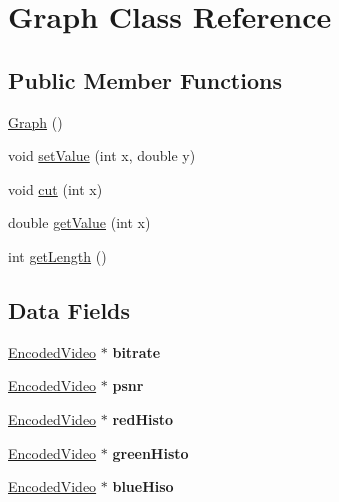 \hypertarget{classGraph}{}\section{Graph Class Reference}
\label{classGraph}
\subsection*{Public Member Functions}
\begin{DoxyCompactItemize}
\item 
\hyperlink{classGraph_afc5ef9d72cc2c509814200791eaef62c}{Graph} ()
\item 
void \hyperlink{classGraph_ab2daf3a9b66c016d330dedbd83d3fa82}{set\+Value} (int x, double y)
\item 
void \hyperlink{classGraph_a940d481971e87001c6e4c17585b41a8e}{cut} (int x)
\item 
double \hyperlink{classGraph_aacd99feb76afec4bc9bdf645d4585880}{get\+Value} (int x)
\item 
int \hyperlink{classGraph_aab0d4bbd0884d04dbe281cc2b9d21206}{get\+Length} ()
\end{DoxyCompactItemize}
\subsection*{Data Fields}
\begin{DoxyCompactItemize}
\item 
\hypertarget{classGraph_a2daaeb5e11f1319a3c0450d8561378b5}{}\hyperlink{classEncodedVideo}{Encoded\+Video} $\ast$ {\bfseries bitrate}\label{classGraph_a2daaeb5e11f1319a3c0450d8561378b5}

\item 
\hypertarget{classGraph_a84698240cf604e54d275115301365092}{}\hyperlink{classEncodedVideo}{Encoded\+Video} $\ast$ {\bfseries psnr}\label{classGraph_a84698240cf604e54d275115301365092}

\item 
\hypertarget{classGraph_ab7435d75a5b47b5663985bd050c4364d}{}\hyperlink{classEncodedVideo}{Encoded\+Video} $\ast$ {\bfseries red\+Histo}\label{classGraph_ab7435d75a5b47b5663985bd050c4364d}

\item 
\hypertarget{classGraph_a14b3b88b545d1aafdb2f776f8408ff62}{}\hyperlink{classEncodedVideo}{Encoded\+Video} $\ast$ {\bfseries green\+Histo}\label{classGraph_a14b3b88b545d1aafdb2f776f8408ff62}

\item 
\hypertarget{classGraph_a36a9f3adb3d4fcca6de96fbe1707eafc}{}\hyperlink{classEncodedVideo}{Encoded\+Video} $\ast$ {\bfseries blue\+Hiso}\label{classGraph_a36a9f3adb3d4fcca6de96fbe1707eafc}

\end{DoxyCompactItemize}


